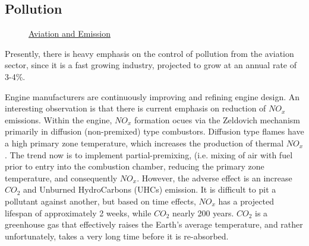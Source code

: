 \documentclass{aer1315-pretty}
\begin{document}
\subsection{Pollution}

\begin{figure}[!h]%
	\:
    \caption {\href{https://www.tc.gc.ca/media/documents/policy/AviationGHGActionPan_Eng.pdf}{Aviation and Emission}}  
\end{figure}

Presently, there is heavy emphasis on the control of pollution from the aviation sector, since it is a fast growing industry, projected to grow at an annual rate of 3-4\%. 

Engine manufacturers are continuously improving and refining engine design. An interesting observation is that there is current emphasis on reduction of $NO_x$ emissions. Within the engine, $NO_x$ formation ocues via the Zeldovich mechanism primarily in diffusion (non-premixed) type combustors. Diffusion type flames have a high primary zone temperature, which increases the production of thermal $NO_x$. The trend now is to implement partial-premixing, (i.e. mixing of air with fuel prior to entry into the combustion chamber, reducing the primary zone temperature, and consequently $NO_x$. However, the adverse effect is an increase $CO_2$ and Unburned HydroCarbons (UHCs) emission. It is difficult to pit a pollutant against another, but based on time effects, $NO_x$ has a projected lifespan of approximately 2 weeks, while $CO_2$ nearly 200 years. $CO_2$ is a greenhouse gas that effectively raises the Earth's average temperature, and rather unfortunately, takes a very long time before it is re-absorbed.\par
\end{document}
